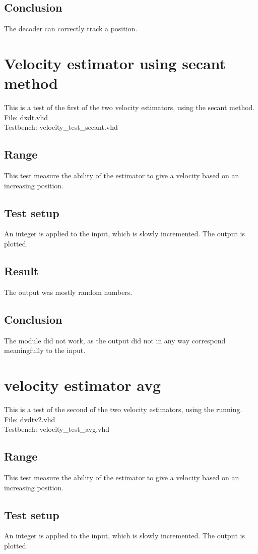 \subsection{Conclusion}
The decoder can correctly track a position.

\section{Velocity estimator using secant method}
This is a test of the first of the two velocity estimators, using the secant method.\\
File: dxdt.vhd\\
Testbench: velocity\_test\_secant.vhd
\subsection{Range}
This test measure the ability of the estimator to give a velocity based on an increasing position.
\subsection{Test setup}
An integer is applied to the input, which is slowly incremented. The output is plotted.
\subsection{Result}
The output was mostly random numbers.
\subsection{Conclusion}
The module did not work, as the output did not in any way correspond meaningfully to the input.

\section{velocity estimator avg}
This is a test of the second of the two velocity estimators, using the running.\\
File: dvdtv2.vhd\\
Testbench: velocity\_test\_avg.vhd
\subsection{Range}
This test measure the ability of the estimator to give a velocity based on an increasing position.
\subsection{Test setup}
An integer is applied to the input, which is slowly incremented. The output is plotted.
